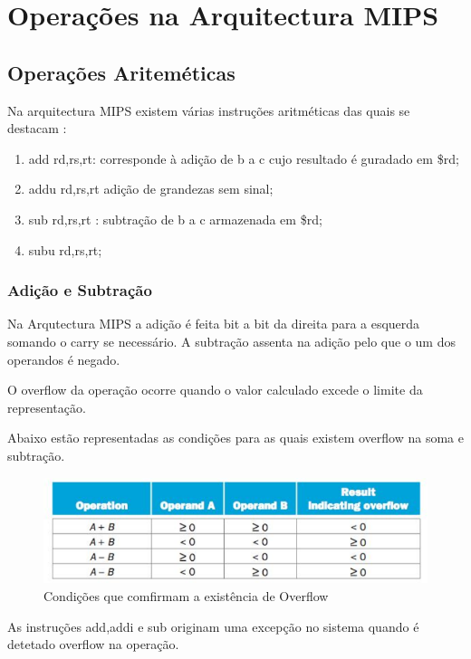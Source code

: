 \documentclass[10pt,a4paper]{book}
\begin{document}
 \chapter{Operações na Arquitectura MIPS}

	\section{Operações Ariteméticas}

	  Na arquitectura MIPS existem várias instruções aritméticas das quais se destacam :
	    \begin{enumerate}
	     \item add rd,rs,rt: corresponde à adição de b a c cujo resultado é guradado em \$rd;
	     \item addu rd,rs,rt adição de grandezas sem sinal;
	     \item sub rd,rs,rt : subtração de b a c armazenada em \$rd;
	     \item subu rd,rs,rt;
	    \end{enumerate}

	    \subsection{Adição e Subtração}
	    	Na Arqutectura MIPS a adição é feita bit a bit da direita para a esquerda somando o carry se necessário. A subtração assenta na adição pelo que o um dos operandos é negado.

	    	O overflow da operação ocorre quando o valor calculado excede o limite da representação.

	    	Abaixo estão representadas as condições para as quais existem overflow na soma e subtração.


			\begin{figure}[htp]
			    \centering
			    \includegraphics[scale=0.4]{of.png}
			    \caption{Condições que comfirmam a existência de Overflow}
			    \label{OF}
			\end{figure}

			As instruções add,addi e sub originam uma excepção no sistema quando é detetado overflow na operação.
\end{document}
